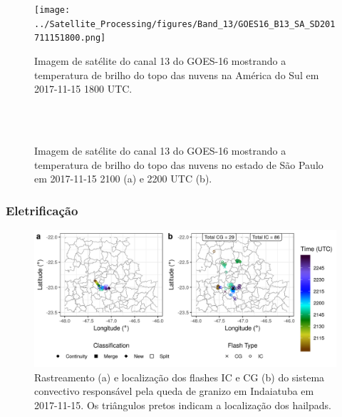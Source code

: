 \begin{figure}[htb]
	\begin{center}
		\caption{Imagem de satélite do canal 13 do GOES-16 mostrando a temperatura de brilho do topo das nuvens na América do Sul em 2017-11-15 1800 UTC.} 
		\label{goes16_sa_20171115}
		\texttt{[image: ../Satellite\_Processing/figures/Band\_13/GOES16\_B13\_SA\_SD201711151800.png]}
	\end{center}
\end{figure}


\begin{figure}[htb]
	\begin{center}
		\caption{Imagem de satélite do canal 13 do GOES-16 mostrando a temperatura de brilho do topo das nuvens no estado de São Paulo em 2017-11-15 2100 (a) e 2200 UTC (b).} 
		\label{goes16_sp_20171115}
		 \\
		 \\
	\end{center}
\end{figure}

\subsubsection{Eletrificação}\label{elec_20171115}

\begin{figure}[htb]
	\begin{center}
		\caption{Rastreamento (a) e localização dos flashes IC e CG (b) do sistema convectivo responsável pela queda de granizo em Indaiatuba em 2017-11-15. Os triângulos pretos indicam a localização dos hailpads.} 
		\label{track_flashes_20171115}
		\includegraphics[width=\columnwidth]{../General_Processing/figures/track_flashes_20171115.png}
	\end{center}
\end{figure}

